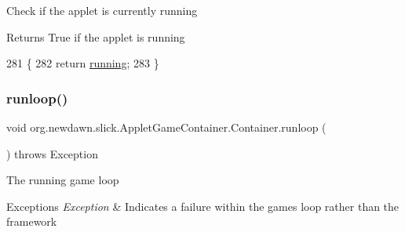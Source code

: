 Check if the applet is currently running

\begin{DoxyReturn}{Returns}
True if the applet is running 
\end{DoxyReturn}

\begin{DoxyCode}
281                                  \{
282          \textcolor{keywordflow}{return} \mbox{\hyperlink{classorg_1_1newdawn_1_1slick_1_1_game_container_a5cb10a093281abb5b6ee60f2b18c26c3}{running}};
283       \}
\end{DoxyCode}
\mbox{\label{classorg_1_1newdawn_1_1slick_1_1_applet_game_container_1_1_container_a5ca9c4fe320f0593d6794d13ddc7490a}} 
\subsubsection{\texorpdfstring{runloop()}{runloop()}}
{\footnotesize\ttfamily void org.\+newdawn.\+slick.\+Applet\+Game\+Container.\+Container.\+runloop (\begin{DoxyParamCaption}{ }\end{DoxyParamCaption}) throws Exception\hspace{0.3cm}{\ttfamily [inline]}}

The running game loop


\begin{DoxyExceptions}{Exceptions}
{\em Exception} & Indicates a failure within the game\textquotesingle{}s loop rather than the framework \\
\hline
\end{DoxyExceptions}

